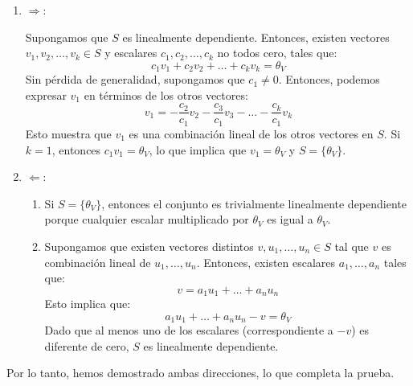 \documentclass{article}
\begin{document}
\begin{enumerate}
    \item \( \Rightarrow \):
    
    Supongamos que \( S \) es linealmente dependiente. Entonces, existen vectores \( v_1, v_2, \ldots, v_k \in S \) y escalares \( c_1, c_2, \ldots, c_k \) no todos cero, tales que:
    \[ c_1 v_1 + c_2 v_2 + \ldots + c_k v_k = \theta_V \]
    Sin pérdida de generalidad, supongamos que \( c_1 \neq 0 \). Entonces, podemos expresar \( v_1 \) en términos de los otros vectores:
    \[ v_1 = -\frac{c_2}{c_1} v_2 - \frac{c_3}{c_1} v_3 - \ldots - \frac{c_k}{c_1} v_k \]
    Esto muestra que \( v_1 \) es una combinación lineal de los otros vectores en \( S \). Si \( k = 1 \), entonces \( c_1 v_1 = \theta_V \), lo que implica que \( v_1 = \theta_V \) y \( S = \{\theta_V\} \).

    \item \( \Leftarrow \):

    \begin{enumerate}
        \item Si \( S = \{\theta_V\} \), entonces el conjunto es trivialmente linealmente dependiente porque cualquier escalar multiplicado por \( \theta_V \) es igual a \( \theta_V \).
        \item Supongamos que existen vectores distintos \( v, u_1, \ldots, u_n \in S \) tal que \( v \) es combinación lineal de \( u_1, \ldots, u_n \). Entonces, existen escalares \( a_1, \ldots, a_n \) tales que:
        \[ v = a_1 u_1 + \ldots + a_n u_n \]
        Esto implica que:
        \[ a_1 u_1 + \ldots + a_n u_n - v = \theta_V \]
        Dado que al menos uno de los escalares (correspondiente a \( -v \)) es diferente de cero, \( S \) es linealmente dependiente.
    \end{enumerate}
\end{enumerate}

Por lo tanto, hemos demostrado ambas direcciones, lo que completa la prueba.
\end{document}
